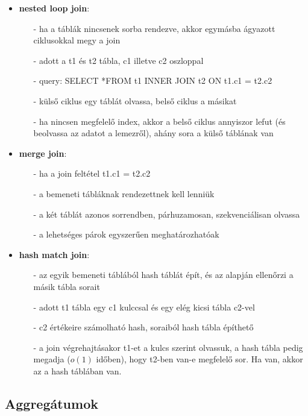 \documentclass[12pt]{article}
\theoremstyle{plain}
\begin{document}
\begin{itemize}
    \item \textbf{nested loop join}:
    \begin{itemize}
        \item[-] ha a táblák nincsenek sorba rendezve, akkor egymásba ágyazott ciklusokkal megy a join
        \item[-] adott a t1 és t2 tábla, c1 illetve c2 oszloppal
        \item[-] query: SELECT *FROM t1 INNER JOIN t2 ON t1.c1 = t2.c2  
        \item[-] külső ciklus egy táblát olvassa, belső ciklus a másikat
        \item[-] ha nincsen megfelelő index, akkor a belső ciklus annyiszor lefut (és beolvassa az adatot a lemezről), ahány sora a külső táblának van
    \end{itemize}{}
    \item \textbf{merge join}:
    \begin{itemize}
        \item[-] ha a join feltétel t1.c1 = t2.c2
        \item[-] a bemeneti tábláknak rendezettnek kell lenniük
        \item[-] a két táblát azonos sorrendben, párhuzamosan, szekvenciálisan olvassa
        \item[-] a lehetséges párok egyszerűen meghatározhatóak
    \end{itemize}{}
    
    \item \textbf{hash match join}:
    \begin{itemize}
        \item[-] az egyik bemeneti táblából hash táblát épít, és az alapján ellenőrzi a másik tábla sorait
        \item[-] adott t1 tábla egy c1 kulccsal és egy elég kicsi tábla c2-vel
        \item[-] c2 értékeire számolható hash, soraiból hash tábla építhető
        \item[-] a join végrehajtásakor t1-et a kulcs szerint olvassuk, a hash tábla pedig megadja ($o(1)$ időben), hogy t2-ben van-e megfelelő sor. Ha van, akkor az a hash táblában van.
    \end{itemize}{}
\end{itemize}{}

\subsection{Aggregátumok}
\end{document}
